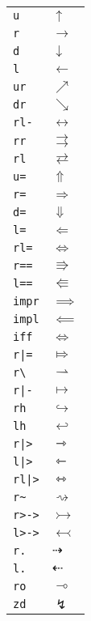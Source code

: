 \begin{longtable}{ll}
\texttt{u}&${}\uparrow {}$\\
\texttt{r}&${}\rightarrow {}$\\
\texttt{d}&${}\downarrow {}$\\
\texttt{l}&${}\leftarrow {}$\\
\texttt{ur}&${}\nearrow {}$\\
\texttt{dr}&${}\searrow {}$\\
\texttt{rl{-}}&${}\leftrightarrow {}$\\
\texttt{rr}&${}\rightrightarrows {}$\\
\texttt{rl}&${}\rightleftarrows {}$\\
\texttt{u=}&${}\Uparrow {}$\\
\texttt{r=}&${}\Rightarrow {}$\\
\texttt{d=}&${}\Downarrow {}$\\
\texttt{l=}&${}\Leftarrow {}$\\
\texttt{rl=}&${}\Leftrightarrow {}$\\
\texttt{r==}&${}\Rrightarrow {}$\\
\texttt{l==}&${}\Lleftarrow {}$\\
\texttt{impr}&${}\implies {}$\\
\texttt{impl}&${}\impliedby {}$\\
\texttt{iff}&${}\iff {}$\\
\texttt{r|=}&${}\Mapsto {}$\\
\texttt{r\textbackslash }&${}\rightharpoonup {}$\\
\texttt{r|{-}}&${}\mapsto {}$\\
\texttt{rh}&${}\hookrightarrow {}$\\
\texttt{lh}&${}\hookleftarrow {}$\\
\texttt{r|>}&${}\rightarrowtriangle {}$\\
\texttt{l|>}&${}\leftarrowtriangle {}$\\
\texttt{rl|>}&${}\leftrightarrowtriangle {}$\\
\texttt{r\textasciitilde }&${}\rightsquigarrow {}$\\
\texttt{r>{-}>}&${}\rightarrowtail {}$\\
\texttt{l>{-}>}&${}\leftarrowtail {}$\\
\texttt{r.}&${}\dashrightarrow {}$\\
\texttt{l.}&${}\dashleftarrow {}$\\
\texttt{ro}&${}\multimap {}$\\
\texttt{zd}&${}\lightning {}$\\

\end{longtable}
